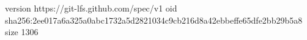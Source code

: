 version https://git-lfs.github.com/spec/v1
oid sha256:2ee017a6a325a0abc1732a5d2821034c9cb216d8a42ebbeffe65dfe2bb29b5a8
size 1306
